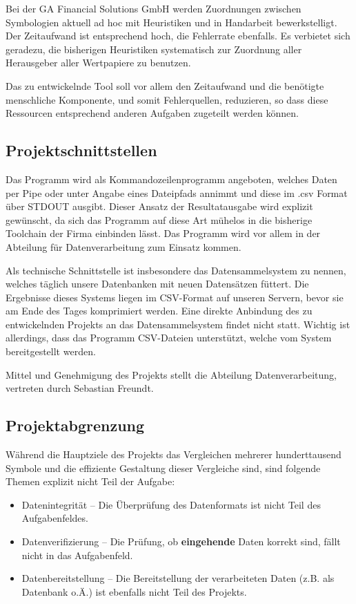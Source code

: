 Bei der GA Financial Solutions GmbH werden Zuordnungen zwischen Symbologien
aktuell ad hoc mit Heuristiken und in Handarbeit bewerkstelligt.  Der
Zeitaufwand ist entsprechend hoch, die Fehlerrate ebenfalls.  Es
verbietet sich geradezu, die bisherigen Heuristiken systematisch zur
Zuordnung aller Herausgeber aller Wertpapiere zu benutzen.\par

Das zu entwickelnde Tool soll vor allem den Zeitaufwand und die benötigte
menschliche Komponente, und somit Fehlerquellen, reduzieren, so dass diese Ressourcen entsprechend
anderen Aufgaben zugeteilt werden können.\par

\subsection{Projektschnittstellen}
Das Programm wird als Kommandozeilenprogramm angeboten, welches
Daten per Pipe oder unter Angabe eines Dateipfads annimmt und diese im .csv 
Format über STDOUT ausgibt. Dieser Ansatz der Resultatausgabe wird explizit gewünscht, 
da sich das Programm auf diese Art mühelos in die bisherige Toolchain der Firma einbinden lässt.
Das Programm wird vor allem in der Abteilung für Datenverarbeitung zum Einsatz kommen.\par

Als technische Schnittstelle ist insbesondere das Datensammelsystem zu nennen,
welches täglich unsere Datenbanken mit neuen Datensätzen füttert. Die Ergebnisse
dieses Systems liegen im CSV-Format auf unseren Servern, bevor sie am Ende des
Tages komprimiert werden. Eine direkte Anbindung des zu entwickelnden Projekts an das Datensammelsystem findet nicht statt. Wichtig ist allerdings, dass das Programm CSV-Dateien unterstützt, welche vom System bereitgestellt werden.\par

Mittel und Genehmigung des Projekts stellt die Abteilung Datenverarbeitung,
vertreten durch Sebastian Freundt.\par

\subsection{Projektabgrenzung}
Während die Hauptziele des Projekts das Vergleichen mehrerer hunderttausend Symbole und die effiziente Gestaltung dieser Vergleiche sind, sind folgende Themen explizit nicht Teil der Aufgabe:

\begin{itemize}
    \item Datenintegrität -- Die Überprüfung des Datenformats ist nicht Teil des Aufgabenfeldes.
    \item Datenverifizierung -- Die Prüfung, ob \textbf{eingehende} Daten korrekt sind, fällt nicht in das Aufgabenfeld.
    \item Datenbereitstellung -- Die Bereitstellung der verarbeiteten Daten (z.B. als Datenbank o.Ä.) ist ebenfalls nicht Teil des Projekts.
\end{itemize}
\clearpage

